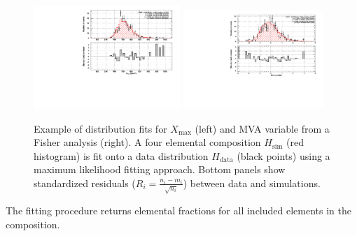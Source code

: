 \documentclass[12pt,a4paper]{report}
\begin{document}
\begin{figure}[!h]
\centering
\includegraphics[width=0.494\textwidth,trim={0.9cm 0.0cm 0.8cm 0.2cm},clip]{figures/dist_fit_example_xmax.pdf}
\includegraphics[width=0.470\textwidth,trim={1.8cm 0.0cm 0.8cm 0.2cm},clip]{figures/dist_fit_example_mva.pdf}
\caption{Example of distribution fits for $X_{\textrm{max}}$ (left) and MVA variable from a Fisher analysis (right). A four elemental composition $H_{\textrm{sim}}$ (red histogram) is fit onto a data distribution $H_{\textrm{data}}$ (black points) using a maximum likelihood fitting approach. Bottom panels show standardized residuals ($R_i = \frac{n_i - m_i}{\sqrt{n_i}}$) between data and simulations.} \label{fig:distFit}
\end{figure}
%
The fitting procedure returns elemental fractions for all included elements in the composition.
\end{document}
